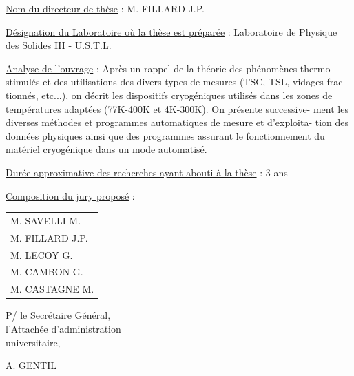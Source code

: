 \uline{Nom du directeur de thèse} : M. FILLARD J.P.

\uline{Désignation du Laboratoire où la thèse est préparée} : Laboratoire de Physique des Solides III - U.S.T.L.

\uline{Analyse de l'ouvrage} : Après un rappel de la théorie des phénomènes thermo-\newline
stimulés et des utilisations des divers types de mesures (TSC, TSL, vidages frac-\newline
tionnés, etc...), on décrit les dispositifs cryogéniques utilisés dans les zones de températures adaptées (77K-400K et 4K-300K). On présente successive-\newline
ment les diverses méthodes et programmes automatiques de mesure et d'exploita-\newline
tion des données physiques ainsi que des programmes assurant le fonctionnement du matériel cryogénique dans un mode automatisé.

\uline{Durée approximative des recherches ayant abouti à la thèse} : 3 ans

\uline{Composition du jury proposé} :
\begin{tabular}{l}
M. SAVELLI M.\\
M. FILLARD J.P.\\
M. LECOY G.\\
M. CAMBON G.\\
M. CASTAGNE M.
\end{tabular}

\begin{flushright}
P/ le Secrétaire Général,\\
l'Attachée d'administration\\
universitaire,


\uline{A. GENTIL}
\end{flushright}


